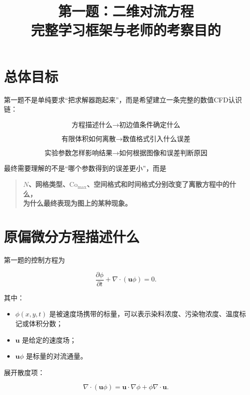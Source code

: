 \documentclass[UTF8,12pt,a4paper,fontset=fandol]{ctexart}
\title{\bfseries 第一题：二维对流方程\\完整学习框架与老师的考察目的}
\author{}
\date{}
\newcommand{\Cmax}{\mathrm{Co}_{\max}}
\begin{document}
\maketitle
\vspace{-2.5em}

\section{总体目标}

第一题不是单纯要求“把求解器跑起来”，而是希望建立一条完整的数值CFD认识链：

\[
\boxed{
\text{方程描述什么}
\longrightarrow
\text{初边值条件确定什么}
}
\]

\[
\boxed{
\text{有限体积如何离散}
\longrightarrow
\text{数值格式引入什么误差}
}
\]

\[
\boxed{
\text{实验参数怎样影响结果}
\longrightarrow
\text{如何根据图像和误差判断原因}
}
\]

最终需要理解的不是“哪个参数得到的误差更小”，而是

\begin{quote}
\centering\bfseries
$N$、网格类型、$\Cmax$、空间格式和时间格式分别改变了离散方程中的什么，\\
为什么最终表现为图上的某种现象。
\end{quote}

\section{原偏微分方程描述什么}

第一题的控制方程为

\begin{equation}
\frac{\partial\phi}{\partial t}
+\nabla\cdot(\bm u\phi)=0.
\end{equation}

其中：

\begin{itemize}
  \item $\phi(x,y,t)$ 是被速度场携带的标量，可以表示染料浓度、污染物浓度、温度标记或体积分数；
  \item $\bm u$ 是给定的速度场；
  \item $\bm u\phi$ 是标量的对流通量。
\end{itemize}

展开散度项：

\begin{equation}
\nabla\cdot(\bm u\phi)
=
\bm u\cdot\nabla\phi
+\phi\nabla\cdot\bm u.
\end{equation}
\end{document}
